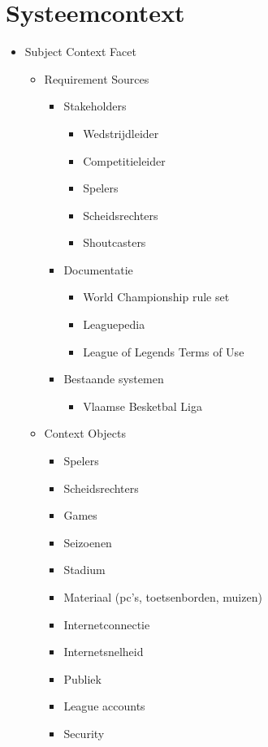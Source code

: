 \documentclass[12pt,a4paper]{article}
\begin{document}
	\section{Systeemcontext}
		\begin{itemize}
			\item Subject Context Facet
			\begin{itemize}
				\item Requirement Sources
				\begin{itemize}
					\item Stakeholders
					\begin{itemize}
						\item Wedstrijdleider
						\item Competitieleider
						\item Spelers
						\item Scheidsrechters
						\item Shoutcasters
					\end{itemize}
					\item Documentatie
					\begin{itemize}
						\item World Championship rule set
						\item Leaguepedia
						\item League of Legends Terms of Use
					\end{itemize}
					\item Bestaande systemen
					\begin{itemize}
						\item Vlaamse Besketbal Liga
					\end{itemize}
				\end{itemize}
				\item Context Objects
				\begin{itemize}
					\item Spelers
					\item Scheidsrechters
					\item Games
					\item Seizoenen
					\item Stadium
					\item Materiaal (pc's, toetsenborden, muizen)
					\item Internetconnectie
					\item Internetsnelheid
					\item Publiek
					\item League accounts
					\item Security
				\end{itemize}

\end{itemize}
\end{itemize}
\end{document}
